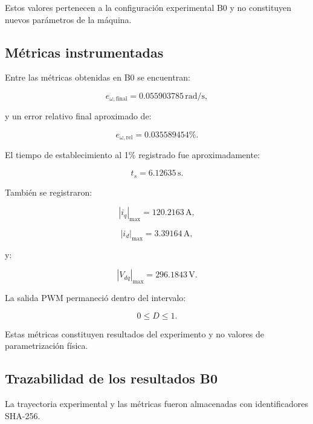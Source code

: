 Estos valores pertenecen a la configuración experimental B0 y no constituyen nuevos parámetros de la máquina.

\subsection{Métricas instrumentadas}

Entre las métricas obtenidas en B0 se encuentran:

\begin{equation}
e_{\omega,\mathrm{final}}
=
0.055903785\,\mathrm{rad/s},
\end{equation}

y un error relativo final aproximado de:

\begin{equation}
e_{\omega,\mathrm{rel}}
=
0.035589454\%.
\end{equation}

El tiempo de establecimiento al 1\% registrado fue aproximadamente:

\begin{equation}
t_s=6.12635\,\mathrm{s}.
\end{equation}

También se registraron:

\begin{equation}
|i_q|_{\max}=120.2163\,\mathrm{A},
\end{equation}

\begin{equation}
|i_d|_{\max}=3.39164\,\mathrm{A},
\end{equation}

y:

\begin{equation}
|V_{dq}|_{\max}=296.1843\,\mathrm{V}.
\end{equation}

La salida PWM permaneció dentro del intervalo:

\begin{equation}
0\leq D\leq1.
\end{equation}

Estas métricas constituyen resultados del experimento y no valores de parametrización física.

\subsection{Trazabilidad de los resultados B0}

La trayectoria experimental y las métricas fueron almacenadas con identificadores SHA-256.

